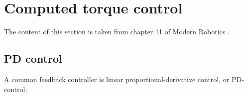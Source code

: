 








\section{Computed torque control}
The content of this section is taken from chapter 11 of Modern Robotics \cite{lynch2017modernCompTorque}.

\subsection{PD control}
A common feedback controller is linear proportional-derivative control, or PD-control:

